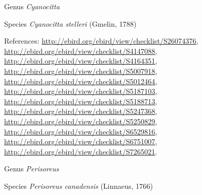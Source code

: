 \documentclass[9pt, article]{memoir}
\begin{document}
\begin{multicols}{2}
\vspace{6pt}\noindent\hspace{30pt}Genus \textit{Cyanocitta}


\vspace{6pt}\noindent\hspace{36pt}Species \textit{Cyanocitta stelleri} (Gmelin, 1788)


\vspace{6pt}References: 
\url{http://ebird.org/ebird/view/checklist/S26074376}, 
\url{http://ebird.org/ebird/view/checklist/S4147088}, 
\url{http://ebird.org/ebird/view/checklist/S4164351}, 
\url{http://ebird.org/ebird/view/checklist/S5007918}, 
\url{http://ebird.org/ebird/view/checklist/S5012464}, 
\url{http://ebird.org/ebird/view/checklist/S5187103}, 
\url{http://ebird.org/ebird/view/checklist/S5188713}, 
\url{http://ebird.org/ebird/view/checklist/S5247368}, 
\url{http://ebird.org/ebird/view/checklist/S5250829}, 
\url{http://ebird.org/ebird/view/checklist/S6529816}, 
\url{http://ebird.org/ebird/view/checklist/S6751007}, 
\url{http://ebird.org/ebird/view/checklist/S7265021}.

\vspace{6pt}\noindent\hspace{30pt}Genus \textit{Perisoreus}


\vspace{6pt}\noindent\hspace{36pt}Species \textit{Perisoreus canadensis} (Linnaeus, 1766)



\end{multicols}
\end{document}
